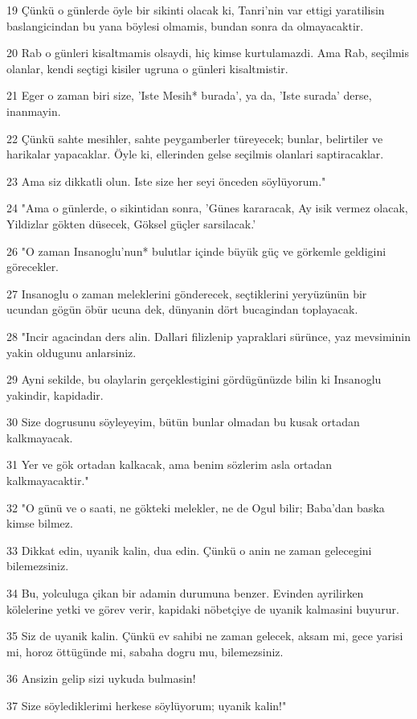 \par 19 Çünkü o günlerde öyle bir sikinti olacak ki, Tanri'nin var ettigi yaratilisin baslangicindan bu yana böylesi olmamis, bundan sonra da olmayacaktir.
\par 20 Rab o günleri kisaltmamis olsaydi, hiç kimse kurtulamazdi. Ama Rab, seçilmis olanlar, kendi seçtigi kisiler ugruna o günleri kisaltmistir.
\par 21 Eger o zaman biri size, 'Iste Mesih* burada', ya da, 'Iste surada' derse, inanmayin.
\par 22 Çünkü sahte mesihler, sahte peygamberler türeyecek; bunlar, belirtiler ve harikalar yapacaklar. Öyle ki, ellerinden gelse seçilmis olanlari saptiracaklar.
\par 23 Ama siz dikkatli olun. Iste size her seyi önceden söylüyorum."
\par 24 "Ama o günlerde, o sikintidan sonra, 'Günes kararacak, Ay isik vermez olacak, Yildizlar gökten düsecek, Göksel güçler sarsilacak.'
\par 26 "O zaman Insanoglu'nun* bulutlar içinde büyük güç ve görkemle geldigini görecekler.
\par 27 Insanoglu o zaman meleklerini gönderecek, seçtiklerini yeryüzünün bir ucundan gögün öbür ucuna dek, dünyanin dört bucagindan toplayacak.
\par 28 "Incir agacindan ders alin. Dallari filizlenip yapraklari sürünce, yaz mevsiminin yakin oldugunu anlarsiniz.
\par 29 Ayni sekilde, bu olaylarin gerçeklestigini gördügünüzde bilin ki Insanoglu yakindir, kapidadir.
\par 30 Size dogrusunu söyleyeyim, bütün bunlar olmadan bu kusak ortadan kalkmayacak.
\par 31 Yer ve gök ortadan kalkacak, ama benim sözlerim asla ortadan kalkmayacaktir."
\par 32 "O günü ve o saati, ne gökteki melekler, ne de Ogul bilir; Baba'dan baska kimse bilmez.
\par 33 Dikkat edin, uyanik kalin, dua edin. Çünkü o anin ne zaman gelecegini bilemezsiniz.
\par 34 Bu, yolculuga çikan bir adamin durumuna benzer. Evinden ayrilirken kölelerine yetki ve görev verir, kapidaki nöbetçiye de uyanik kalmasini buyurur.
\par 35 Siz de uyanik kalin. Çünkü ev sahibi ne zaman gelecek, aksam mi, gece yarisi mi, horoz öttügünde mi, sabaha dogru mu, bilemezsiniz.
\par 36 Ansizin gelip sizi uykuda bulmasin!
\par 37 Size söylediklerimi herkese söylüyorum; uyanik kalin!"

